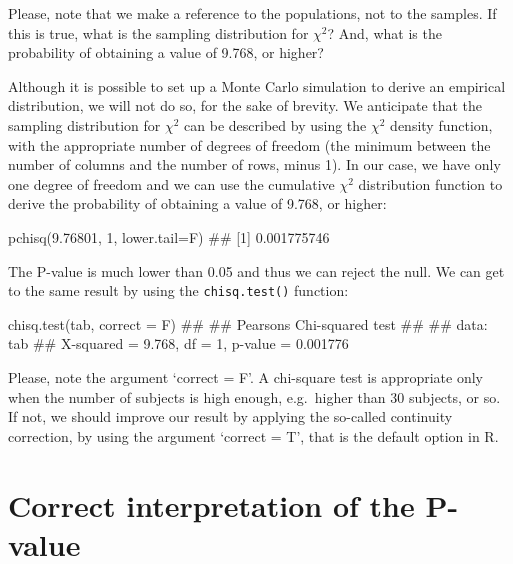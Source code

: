 \documentclass[a4paper,12pt,oneside]{book}
\newenvironment{Shaded}{\begin{snugshade}}{\end{snugshade}}
\newcommand{\DecValTok}[1]{#1}
\newcommand{\FloatTok}[1]{#1}
\newcommand{\DocumentationTok}[1]{#1}
\newcommand{\FunctionTok}[1]{#1}
\newcommand{\AttributeTok}[1]{#1}
\newcommand{\NormalTok}[1]{#1}
\begin{document}
Please, note that we make a reference to the populations, not to the samples. If this is true, what is the sampling distribution for \(\chi^2\)? And, what is the probability of obtaining a value of 9.768, or higher?

Although it is possible to set up a Monte Carlo simulation to derive an empirical distribution, we will not do so, for the sake of brevity. We anticipate that the sampling distribution for \(\chi^2\) can be described by using the \(\chi^2\) density function, with the appropriate number of degrees of freedom (the minimum between the number of columns and the number of rows, minus 1). In our case, we have only one degree of freedom and we can use the cumulative \(\chi^2\) distribution function to derive the probability of obtaining a value of 9.768, or higher:

\begin{Shaded}
\begin{Highlighting}[]
\FunctionTok{pchisq}\NormalTok{(}\FloatTok{9.76801}\NormalTok{, }\DecValTok{1}\NormalTok{, }\AttributeTok{lower.tail=}\NormalTok{F)}
\DocumentationTok{\#\# [1] 0.001775746}
\end{Highlighting}
\end{Shaded}

The P-value is much lower than 0.05 and thus we can reject the null. We can get to the same result by using the \texttt{chisq.test()} function:

\begin{Shaded}
\begin{Highlighting}[]
\FunctionTok{chisq.test}\NormalTok{(tab, }\AttributeTok{correct =}\NormalTok{ F)}
\DocumentationTok{\#\# }
\DocumentationTok{\#\#  Pearson\textquotesingle{}s Chi{-}squared test}
\DocumentationTok{\#\# }
\DocumentationTok{\#\# data:  tab}
\DocumentationTok{\#\# X{-}squared = 9.768, df = 1, p{-}value = 0.001776}
\end{Highlighting}
\end{Shaded}

Please, note the argument `correct = F'. A chi-square test is appropriate only when the number of subjects is high enough, e.g.~higher than 30 subjects, or so. If not, we should improve our result by applying the so-called continuity correction, by using the argument `correct = T', that is the default option in R.

\hypertarget{correct-interpretation-of-the-p-value}{%
\section{Correct interpretation of the P-value}\label{correct-interpretation-of-the-p-value}}
\end{document}
